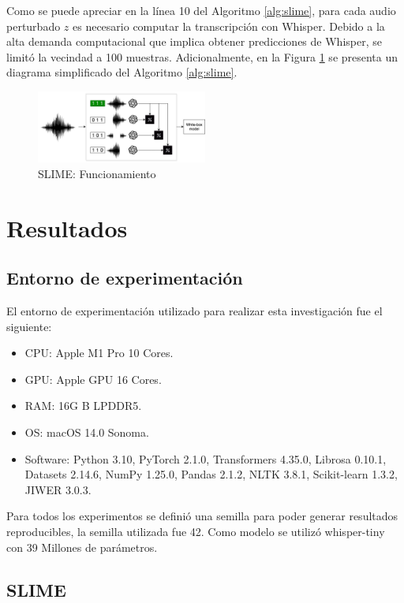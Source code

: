 \documentclass[conference]{IEEEtran}
\begin{document}
Como se puede apreciar en la línea 10 del Algoritmo \ref{alg:slime}, para cada audio perturbado $z$ es necesario computar la transcripción con Whisper. Debido a la alta demanda computacional que implica obtener predicciones de Whisper, se limitó la vecindad a 100 muestras. Adicionalmente, en la Figura \ref{fig:diagram} se presenta un diagrama simplificado del Algoritmo \ref{alg:slime}.

\begin{figure}[ht]
\centerline{\includegraphics[width=0.5\textwidth]{./images/diagram.png}}
\caption{SLIME: Funcionamiento}
\label{fig:diagram}
\end{figure}

\section{Resultados} \label{6-Results}

\subsection{Entorno de experimentación}
El entorno de experimentación utilizado para realizar esta investigación fue el siguiente:
\begin{itemize}
    \item CPU: Apple M1 Pro 10 Cores.
    \item GPU: Apple GPU 16 Cores.
    \item RAM: 16G B LPDDR5.
    \item OS: macOS 14.0 Sonoma.
    \item Software: Python 3.10, PyTorch 2.1.0, Transformers 4.35.0, Librosa 0.10.1, Datasets 2.14.6, NumPy 1.25.0, Pandas 2.1.2, NLTK 3.8.1, Scikit-learn 1.3.2, JIWER 3.0.3.
\end{itemize}

Para todos los experimentos se definió una semilla para poder generar resultados reproducibles, la semilla utilizada fue 42.
Como modelo se utilizó whisper-tiny con 39 Millones de parámetros.

\subsection{SLIME}
\end{document}
